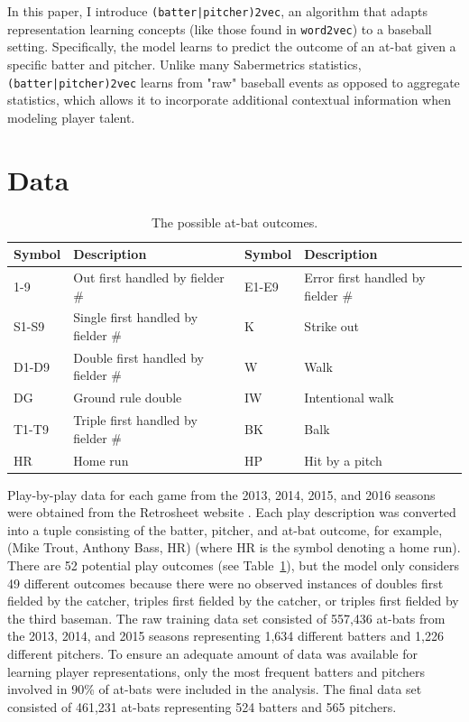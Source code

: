 \documentclass{article}
\begin{document}
In this paper, I introduce \texttt{(batter|pitcher)2vec}, an algorithm that adapts representation learning concepts (like those found in \texttt{word2vec}) to a baseball setting. Specifically, the model learns to predict the outcome of an at-bat given a specific batter and pitcher. Unlike many Sabermetrics statistics, \texttt{(batter|pitcher)2vec} learns from "raw" baseball events as opposed to aggregate statistics, which allows it to incorporate additional contextual information when modeling player talent.

\section{Data}
\label{data}

\begin{table}
\centering
\begin{adjustbox}{max width=\textwidth}
    \begin{tabular}{ | l | l | l | l | }
    \hline
    Symbol & Description & Symbol & Description \\ 
    \hline\hline
    1-9 & Out first handled by fielder \# & E1-E9 & Error first handled by fielder \# \\
    \hline
    S1-S9 & Single first handled by fielder \# & K & Strike out \\
    \hline
    D1-D9 & Double first handled by fielder \# & W & Walk \\
    \hline
    DG & Ground rule double & IW & Intentional walk \\
    \hline
    T1-T9 & Triple first handled by fielder \# & BK & Balk \\
    \hline
    HR & Home run & HP & Hit by a pitch \\
    \hline
    \end{tabular}
\end{adjustbox}
\caption{The possible at-bat outcomes.}
\label{table:at_bats}
\end{table}

Play-by-play data for each game from the 2013, 2014, 2015, and 2016 seasons were obtained from the Retrosheet website \parencite{Retro}. Each play description was converted into a tuple consisting of the batter, pitcher, and at-bat outcome, for example, (Mike Trout, Anthony Bass, HR) (where HR is the symbol denoting a home run). There are 52 potential play outcomes (see Table~\ref{table:at_bats}), but the model only considers 49 different outcomes because there were no observed instances of doubles first fielded by the catcher, triples first fielded by the catcher, or triples first fielded by the third baseman. The raw training data set consisted of 557,436 at-bats from the 2013, 2014, and 2015 seasons representing 1,634 different batters and 1,226 different pitchers. To ensure an adequate amount of data was available for learning player representations, only the most frequent batters and pitchers involved in 90\% of at-bats were included in the analysis. The final data set consisted of 461,231 at-bats representing 524 batters and 565 pitchers.
\end{document}
